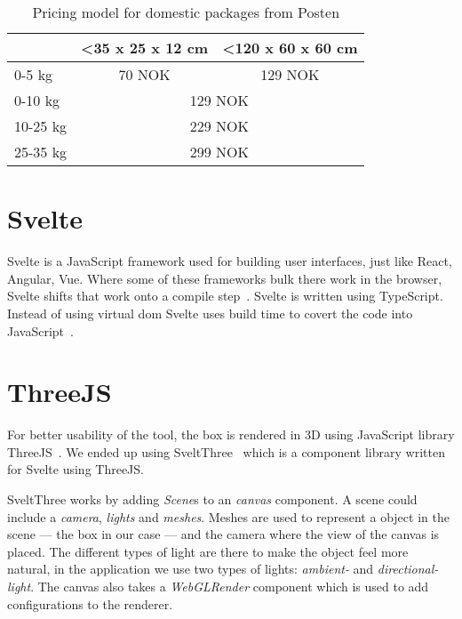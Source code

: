 \begin{table}[h]
    \centering
    \caption{Pricing model for domestic packages from Posten}
    \label{pricingmodel}
    \begin{tabular}{|l|cl|}
    \hline
             & \multicolumn{1}{l|}{\textless 35 x 25 x 12 cm} & \textless 120 x 60 x 60 cm    \\ \hline
    0-5 kg   & \multicolumn{1}{c|}{70 NOK}                     & \multicolumn{1}{c|}{129 NOK} \\ \hline
    0-10 kg  & \multicolumn{2}{c|}{129 NOK}                                                   \\ \hline
    10-25 kg & \multicolumn{2}{c|}{229 NOK}                                                   \\ \hline
    25-35 kg & \multicolumn{2}{c|}{299 NOK}                                                   \\ \hline
    \end{tabular}
\end{table}


\section{Svelte}
Svelte is a JavaScript framework used for building user interfaces, just like React, 
Angular, Vue. Where some of these frameworks bulk there work in the browser, Svelte 
shifts that work onto a compile step~\cite{sveltewebsite}. Svelte is written using 
TypeScript. Instead of using virtual \gls{dom} Svelte uses build time to covert the 
code into JavaScript~\cite{sveltedocs}.

\section{ThreeJS}
For better usability of the tool, the box is rendered in 3D using JavaScript library ThreeJS~\cite{threejs}. We ended up using SveltThree~\cite{sveltthree} which is a component library written for Svelte using ThreeJS. 

SveltThree works by adding \textit{Scene}s to an \textit{canvas} component. A scene 
could include a \textit{camera}, \textit{lights} and \textit{meshes}. Meshes are 
used to represent a object in the scene --- the box in our case --- and the camera 
where the view of the canvas is placed. The different types of light are there to 
make the object feel more natural, in the application we use two types of lights: 
\textit{ambient-} and \textit{directional-light}. The canvas also takes a 
\textit{WebGLRender} component which is used to add configurations to the renderer. 


